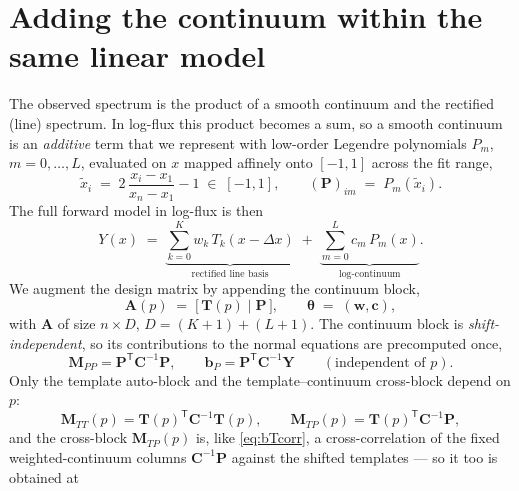 \documentclass[11pt]{article}
\newcommand{\T}{\mathsf{T}}                    %
\newcommand{\dx}{\Delta x}                     %
\begin{document}
\section{Adding the continuum within the same linear model}
\label{sec:continuum}
The observed spectrum is the product of a smooth continuum and the rectified
(line) spectrum. In log-flux this product becomes a sum, so a smooth continuum is
an \emph{additive} term that we represent with low-order Legendre polynomials
$P_m$, $m=0,\dots,L$, evaluated on $x$ mapped affinely onto $[-1,1]$ across the
fit range,
\begin{equation}
  \tilde{x}_i \;=\; 2\,\frac{x_i - x_1}{x_n - x_1} - 1 \;\in\; [-1,1],
  \qquad
  (\mathbf{P})_{im}\;=\;P_m(\tilde{x}_i).
\end{equation}
The full forward model in log-flux is then
\begin{equation}
  Y(x) \;=\; \underbrace{\sum_{k=0}^{K} w_k\,T_k(x-\dx)}_{\text{rectified line basis}}
  \;+\; \underbrace{\sum_{m=0}^{L} c_m\,P_m(x)}_{\text{log-continuum}} .
  \label{eq:fullmodel}
\end{equation}
We augment the design matrix by appending the continuum block,
\begin{equation}
  \mathbf{A}(p) \;=\; \big[\,\mathbf{T}(p)\;\big|\;\mathbf{P}\,\big],
  \qquad
  \boldsymbol\theta \;=\; (\mathbf{w},\mathbf{c}),
\end{equation}
with $\mathbf{A}$ of size $n\times D$, $D=(K{+}1)+(L{+}1)$. The continuum block is
\emph{shift-independent}, so its contributions to the normal equations are
precomputed once,
\begin{equation}
  \mathbf{M}_{PP} = \mathbf{P}^\T\mathbf{C}^{-1}\mathbf{P},
  \qquad
  \mathbf{b}_P = \mathbf{P}^\T\mathbf{C}^{-1}\mathbf{Y}
  \qquad(\text{independent of }p).
\end{equation}
Only the template auto-block and the template--continuum cross-block depend on
$p$:
\begin{equation}
  \mathbf{M}_{TT}(p) = \mathbf{T}(p)^\T\mathbf{C}^{-1}\mathbf{T}(p),
  \qquad
  \mathbf{M}_{TP}(p) = \mathbf{T}(p)^\T\mathbf{C}^{-1}\mathbf{P},
\end{equation}
and the cross-block $\mathbf{M}_{TP}(p)$ is, like \eqref{eq:bTcorr}, a
cross-correlation of the fixed weighted-continuum columns
$\mathbf{C}^{-1}\mathbf{P}$ against the shifted templates --- so it too is obtained at
\end{document}
